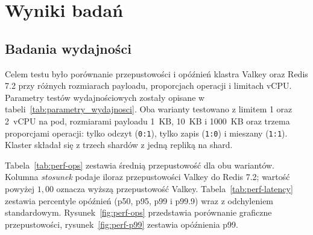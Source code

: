 \chapter{Wyniki badań}\label{ch:wyniki}

\section{Badania wydajności}

Celem testu było porównanie przepustowości i opóźnień klastra Valkey oraz Redis 7.2 przy różnych rozmiarach payloadu, proporcjach operacji i limitach vCPU. Parametry testów wydajnościowych zostały opisane w tabeli~\ref{tab:parametry_wydajnosci}. Oba warianty testowano z limitem 1 oraz 2~vCPU na pod, rozmiarami payloadu 1~KB, 10~KB i 1000~KB oraz trzema proporcjami operacji: tylko odczyt (\texttt{0:1}), tylko zapis (\texttt{1:0}) i mieszany (\texttt{1:1}). Klaster składał się z trzech shardów z jedną repliką na shard.

Tabela~\ref{tab:perf-ops} zestawia średnią przepustowość dla obu wariantów. Kolumna \textit{stosunek} podaje iloraz przepustowości Valkey do Redis 7.2; wartość powyżej $1{,}00$ oznacza wyższą przepustowość Valkey. Tabela~\ref{tab:perf-latency} zestawia percentyle opóźnień (p50, p95, p99 i p99.9) wraz z odchyleniem standardowym. Rysunek~\ref{fig:perf-ops} przedstawia porównanie graficzne przepustowości, rysunek~\ref{fig:perf-p99} zestawia opóźnienia p99.

